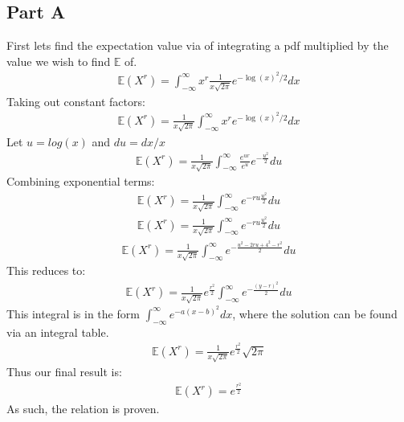 \documentclass{article}
\begin{document}
\subsection*{Part A}
First lets find the expectation value via of integrating a pdf multiplied by the value we wish to find $\mathbb{E}$ of.
\begin{align*}
\mathbb{E}(X^r) = \int_{-\infty}^{\infty} x^r \frac{1}{x\sqrt{2\pi}}e^{-\log(x)^2/2} dx
\end{align*}
Taking out constant factors:
\begin{align*}
\mathbb{E}(X^r) = \frac{1}{x\sqrt{2\pi}} \int_{-\infty}^{\infty} x^r e^{-\log(x)^2/2} dx
\end{align*}
Let $u=log(x)$ and $du = dx/x$
\begin{align*}
\mathbb{E}(X^r) = \frac{1}{x\sqrt{2\pi}} \int_{-\infty}^{\infty} \frac{e^{u r}}{e^{u}} e^{-\frac{u^2}{2}} du
\end{align*}
Combining exponential terms:
\begin{align*}
\mathbb{E}(X^r) = \frac{1}{x\sqrt{2\pi}} \int_{-\infty}^{\infty}  e^{-r u \frac{u^2}{2}} du
\end{align*}
\begin{align*}
\mathbb{E}(X^r) = \frac{1}{x\sqrt{2\pi}} \int_{-\infty}^{\infty}  e^{-r u \frac{u^2}{2}} du
\end{align*}
\begin{align*}
\mathbb{E}(X^r) = \frac{1}{x\sqrt{2\pi}} \int_{-\infty}^{\infty}  e^{-\frac{u^2-2ru+4^2-r^2}{2}} du
\end{align*}
This reduces to:
\begin{align*}
\mathbb{E}(X^r) = \frac{1}{x\sqrt{2\pi}} e^{\frac{r^2}{2}}\int_{-\infty}^{\infty}  e^{-\frac{(y-r)^2}{2}} du
\end{align*}
This integral is in the form $\int_{-\infty}^{\infty}e^{-a (x-b)^2}dx$, where the solution can be found via an integral table.
\begin{align*}
\mathbb{E}(X^r) = \frac{1}{x\sqrt{2\pi}} e^{\frac{r^2}{2}} \sqrt{2 \pi}
\end{align*}
Thus our final result is:
\begin{align*}
\boxed{ \mathbb{E}(X^r) =  e^{\frac{r^2}{2}} }
\end{align*}
As such, the relation is proven.
\end{document}
